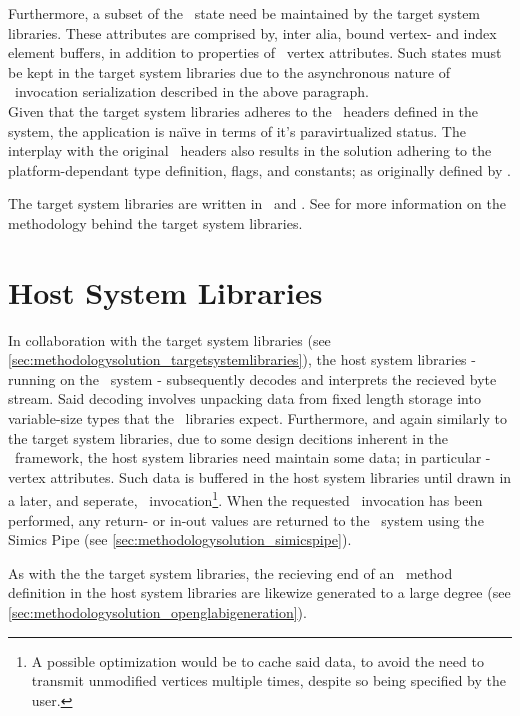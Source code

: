 Furthermore, a subset of the \dvttermopengl\ state need be maintained by the target system libraries.
These attributes are comprised by, inter alia, bound vertex- and index element buffers, in addition to properties of \dvttermopengl\ vertex attributes.
Such states must be kept in the target system libraries due to the asynchronous nature of \dvttermopengl\ invocation serialization described in the above paragraph.\\

\noindent
Given that the target system libraries adheres to the \dvttermopengl\ headers defined in the system, the application is na\"{\i}ve in terms of it's paravirtualized status.
The interplay with the original \dvttermopengles\ headers also results in the solution adhering to the platform-dependant type definition, flags, and constants; as originally defined by \dvttermkhronos .

The target system libraries are written in \dvttermc\ and \dvttermcplusplus .
See  for more information on the methodology behind the target system libraries.

\section{Host System Libraries}
\label{sec:methodologysolution_hostsystemlibraries}
In collaboration with the target system libraries (see \ref{sec:methodologysolution_targetsystemlibraries}), the host system libraries - running on the \dvttermhost\ system - subsequently decodes and interprets the recieved byte stream.
Said decoding involves unpacking data from fixed length storage into variable-size types that the \dvttermopengl\ libraries expect.
Furthermore, and again similarly to the target system libraries, due to some design decitions inherent in the \dvttermopenglestwopointo\ framework, the host system libraries need maintain some data; in particular - vertex attributes.
Such data is buffered in the host system libraries until drawn in a later, and seperate, \dvttermopengl\ invocation\footnote{A possible optimization would be to cache said data, to avoid the need to transmit unmodified vertices multiple times, despite so being specified by the user.}.
When the requested \dvttermopengl\ invocation has been performed, any return- or in-out values are returned to the \dvttermtarget\ system using the Simics Pipe (see \ref{sec:methodologysolution_simicspipe}).

As with the the target system libraries, the recieving end of an \dvttermopengl\ method definition in the host system libraries are likewize generated to a large degree (see \ref{sec:methodologysolution_openglabigeneration}).

